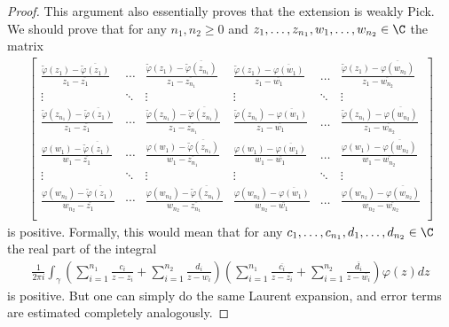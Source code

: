 \begin{proof}
	This argument also essentially proves that the extension is weakly Pick. We should prove that for any $n_{1}, n_{2} \geq 0$ and $z_{1}, \ldots, z_{n_{1}}, w_{1}, \ldots, w_{n_{2}} \in \C$ the matrix
	\begin{align*}
		\begin{bmatrix}
			\frac{\tilde{\varphi}(z_{1}) - \overline{\tilde{\varphi}(z_{1})}}{z_{1} - \overline{z_{1}}} & \cdots & \frac{\tilde{\varphi}(z_{1}) - \overline{\tilde{\varphi}(z_{n_{1}})}}{z_{1} - \overline{z_{n_{1}}}} & \frac{\tilde{\varphi}(z_{1}) - \overline{\varphi(w_{1})}}{z_{1} - \overline{w_{1}}} & \ldots & \frac{\tilde{\varphi}(z_{1}) - \overline{\varphi(w_{n_{2}})}}{z_{1} - \overline{w_{n_{2}}}} \\
			\vdots & \ddots & \vdots & \vdots & \ddots & \vdots \\
			\frac{\tilde{\varphi}(z_{n_{1}}) - \overline{\tilde{\varphi}(z_{1})}}{z_{1} - \overline{z_{1}}} & \cdots & \frac{\tilde{\varphi}(z_{n_{1}}) - \overline{\tilde{\varphi}(z_{n_{1}})}}{z_{1} - \overline{z_{n_{1}}}} & \frac{\tilde{\varphi}(z_{n_{1}}) - \overline{\varphi(w_{1})}}{z_{1} - \overline{w_{1}}} & \ldots & \frac{\tilde{\varphi}(z_{n_{1}}) - \overline{\varphi(w_{n_{2}})}}{z_{1} - \overline{w_{n_{2}}}} \\
			\frac{\varphi(w_{1}) - \overline{\tilde{\varphi}(z_{1})}}{w_{1} - \overline{z_{1}}} & \cdots & \frac{\varphi(w_{1}) - \overline{\tilde{\varphi}(z_{n_{1}})}}{w_{1} - \overline{z_{n_{1}}}} & \frac{\varphi(w_{1}) - \overline{\varphi(w_{1})}}{w_{1} - \overline{w_{1}}} & \ldots & \frac{\varphi(w_{1}) - \overline{\varphi(w_{n_{2}})}}{w_{1} - \overline{w_{n_{2}}}} \\
			\vdots & \ddots & \vdots & \vdots & \ddots & \vdots \\
			\frac{\varphi(w_{n_{2}}) - \overline{\tilde{\varphi}(z_{1})}}{w_{n_{2}} - \overline{z_{1}}} & \cdots & \frac{\varphi(w_{n_{2}}) - \overline{\tilde{\varphi}(z_{n_{1}})}}{w_{n_{2}} - \overline{z_{n_{1}}}} & \frac{\varphi(w_{n_{2}}) - \overline{\varphi(w_{1})}}{w_{n_{2}} - \overline{w_{1}}} & \ldots & \frac{\varphi(w_{n_{2}}) - \overline{\varphi(w_{n_{2}})}}{w_{n_{2}} - \overline{w_{n_{2}}}} \\
		\end{bmatrix}
	\end{align*}
	is positive. Formally, this would mean that for any $c_{1}, \ldots, c_{n_{1}}, d_{1}, \ldots, d_{n_{2}} \in \C$ the real part of the integral
	\begin{align*}
		\frac{1}{2 \pi i}\int_{\gamma} \left(\sum_{i = 1}^{n_{1}} \frac{c_{i}}{z - z_{i}} + \sum_{i = 1}^{n_{2}} \frac{d_{i}}{z - w_{i}}\right) \left(\sum_{i = 1}^{n_{1}} \frac{\overline{c_{i}}}{z - \overline{z_{i}}} + \sum_{i = 1}^{n_{2}} \frac{\overline{d_{i}}}{z - \overline{w_{i}}}\right) \varphi(z) dz
	\end{align*}
	is positive. But one can simply do the same Laurent expansion, and error terms are estimated completely analogously.
\end{proof}

